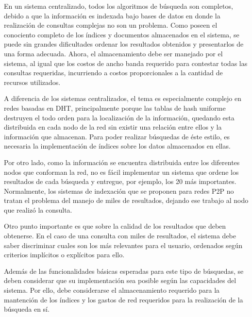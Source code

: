     En un sistema centralizado, todos los algoritmos de búsqueda son completos,
    debido a que la información es indexada bajo bases de datos en donde la
    realización de consultas complejas no son un problema. Como poseen el
    conociento completo de los índices y documentos almacenados en el sistema,
    se puede sin grandes dificultades
    ordenar los resultados obtenidos y presentarlos de una forma adecuada. Ahora, el
    almacenamiento debe ser manejado por el sistema, al igual que
    los costos de ancho banda requerido para contestar todas las consultas
    requeridas, incurriendo a costos proporcionales a la cantidad de recursos
    utilizados. 

    A diferencia de los sistemas centralizados, el tema es especialmente complejo en redes basadas en DHT, principalmente
    porque las tablas de hash uniforme destruyen el todo orden para la
    localización de la información, quedando esta distribuida en cada nodo de
    la red sin existir una relación entre ellos y la información que almacenan.
    Para poder realizar búsquedas de éste estilo, es necesaria la
    implementación de índices sobre los datos almacenados en ellas.

    Por otro lado, como la información se encuentra distribuida entre los
    diferentes nodos que conforman la red, no es fácil implementar un sistema
    que ordene los resultados de cada búsqueda y entregue, por ejemplo, los 20
    más importantes. 
    Normalmente, los sistemas de
    indexación que se proponen para redes P2P no tratan el problema del manejo de
    miles de resultados, dejando ese trabajo al nodo que realizó la consulta.

    Otro punto importante es que sobre la calidad de los resultados que deben
    obtenerse. En el caso de una consulta con miles de resultados, el sistema
    debe saber discriminar cuales son los más relevantes para el usuario, ordenados
    según criterios implícitos o explícitos para ello.

    Además de las funcionalidades básicas esperadas para este tipo de
    búsquedas, se deben considerar que su implementación sea posible según
    las capacidades del sistema. Por ello, debe
    considerarse el almacenamiento requerido para la mantención de los índices
    y los gastos de red requeridos para la realización de la búsqueda
    en sí.


